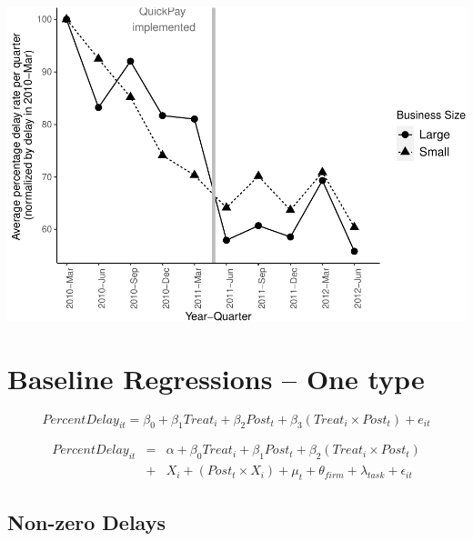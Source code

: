 \documentclass[
]{article}
\begin{document}
\includegraphics{qp_first_pc_delay_non_zero_files/figure-latex/normalized_plot-1.pdf}

\hypertarget{baseline-regressions-one-type}{%
\section{Baseline Regressions -- One
type}\label{baseline-regressions-one-type}}

\[ PercentDelay_{it} = \beta_0 + \beta_1 Treat_i + \beta_2 Post_t + \beta_3 (Treat_i \times Post_t) + e_{it}\]

\[ \begin{aligned} PercentDelay_{it} &=& \alpha+\beta_0 Treat_i + \beta_1 Post_t + \beta_2 (Treat_i \times Post_t)\\
&+&  X_i + (Post_t \times X_i) + \mu_t + \theta_{firm} + \lambda_{task}+ \epsilon_{it}
\end{aligned}\]

\hypertarget{non-zero-delays}{%
\subsection{Non-zero Delays}\label{non-zero-delays}}
\end{document}
